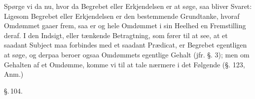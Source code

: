 \documentclass[12pt]{book}
\def\textit#1{#1}%
\def\emph#1{#1}%
\newcommand{\parag}[1]{%
  \par\vspace{0.9\baselineskip}%
  {\centering\textit{\S.\,#1.}\par}%
  \vspace{0.35\baselineskip}%
  \noindent\hspace{\parindent}\ignorespaces
}
\begin{document}
Spørge vi da nu, hvor da Begrebet eller Erkjendelsen er at søge, saa bliver Svaret:
Ligesom Begrebet eller Erkjendelsen er den bestemmende Grundtanke, hvoraf Omdømmet
gaaer frem, saa er og hele \emph{Omdømmet} i sin \emph{Heelhed} en Fremstilling deraf.
I den Indsigt, eller tænkende Betragtning, som fører til at see, at et saadant
\emph{Subject} maa forbindes med et saadant \emph{Prædicat}, er Begrebet egentligen at
søge, og derpaa beroer ogsaa Omdømmets egentlige Gehalt (jfr. §. 3); men om Gehalten af
et Omdømme, komme vi til at tale nærmere i det Følgende (§. 123, Anm.)

\parag{104}
\end{document}
